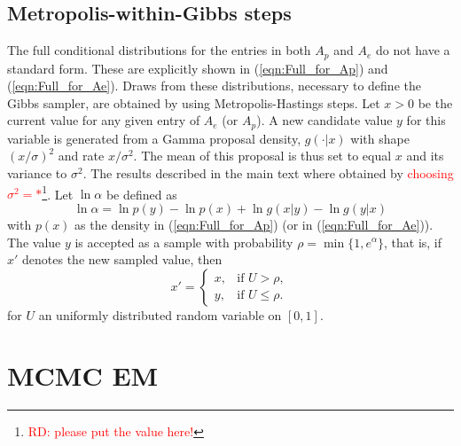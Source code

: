 \documentclass[11pt]{amsart}
\theoremstyle{definition}
\theoremstyle{remark}
\begin{document}
\subsection{Metropolis-within-Gibbs steps}\label{sec:MHsteps}
The full conditional distributions for the entries in both $A_p$ and
$A_e$ do not have a standard form. These are explicitly shown in
(\ref{eqn:Full_for_Ap}) and (\ref{eqn:Full_for_Ae}). Draws from these
distributions, necessary to define the Gibbs sampler,  are obtained by
using Metropolis-Hastings steps.  Let $x > 0$ be the current value
for any given entry of $A_e$ (or $A_p$). A new candidate value $y$ for
this variable is generated from a Gamma proposal density, $g(\cdot|
x)$ with shape $(x/\sigma)^2$ and rate $x/\sigma^2$. The mean of this
proposal is thus set to equal $x$ and its variance to $\sigma^2$. The 
results  described in the main text where obtained by
\textcolor{red}{choosing 
  $\sigma^2 = *$}\footnote{\textcolor{red}{RD: please put the value
    here!}}. Let $\ln \alpha$ be defined as
\[
  \ln \alpha 
 =
  \ln p(y) - \ln p(x) + \ln g(x|y) - \ln g(y|x)
\]
with $p(x)$ as the density in (\ref{eqn:Full_for_Ap}) (or in  
(\ref{eqn:Full_for_Ae})). The value $y$ is accepted as a sample
with probability $\rho = \min\{1, e^{\alpha}\}$, that is, if $x'$ denotes
the new sampled value, then
\[
   x'
    =
  \begin{cases}
    x, & \text{if } U > \rho,\\
    y, & \text{if } U \leq \rho.
  \end{cases}
\]
for $U$ an uniformly distributed random variable on $[0, 1]$.

\section{MCMC EM}
\end{document}
